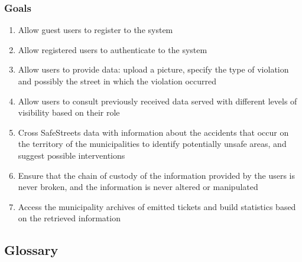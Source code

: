 \subsubsection{Goals}
	\label{sec:goals}
	\begin{enumerate}[label=\textbf{G\arabic*}]
		\item \label{goal:register} Allow guest users to register to the system
		\item \label{goal:login} Allow registered users to authenticate to the system
		\item \label{goal:provideData} Allow users to provide data: upload a picture, specify the type of violation and possibly the street in which the violation occurred
		\item \label{goal:retrieveData} Allow users to consult previously received data served with different levels of visibility based on their role
		\item \label{goal:connectMunicipality} Cross SafeStreets data with information about the accidents that occur on the territory of the municipalities to identify potentially unsafe areas, and suggest possible interventions
		\item \label{goal:avoidLeaks} Ensure that the chain of custody of the information provided by the users is never broken, and the information is never altered or manipulated
		\item \label{goal:ticketsInformation} Access the municipality archives of emitted tickets and build statistics based on the retrieved information
	\end{enumerate}

\subsection{Glossary}
